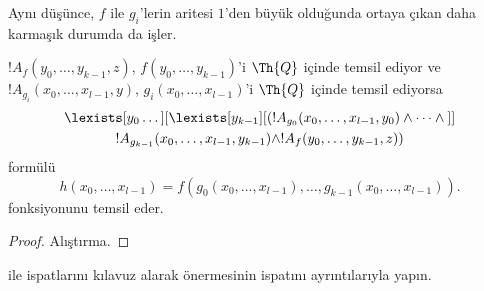 \documentclass[../../../include/open-logic-section]{subfiles}
\begin{document}
Aynı düşünce, $f$ ile $g_i$'lerin aritesi $1$'den büyük olduğunda ortaya
çıkan daha karmaşık durumda da işler.

\begin{prop}
$!A_f(y_0,\dots,y_{k-1},z)$, $f(y_0,\dots,y_{k-1})$'i $\Th{Q}$ içinde
temsil ediyor ve $!A_{g_i}(x_0,\dots,x_{l-1},y)$,
$g_i(x_0,\dots,x_{l-1})$'i $\Th{Q}$ içinde temsil ediyorsa
\begin{multline*}
  \lexists[y_0\dots][\lexists[y_{k-1}][(!A_{g_0}(x_0,\dots,x_{l-1},y_0) \land
      \dots \land {}]]\\
  !A_{g_{k-1}}(x_0,\dots,x_{l-1},y_{k-1}) \land !A_f(y_0,\dots,y_{k-1},z))
\end{multline*}
formülü
\[
h(x_0, \dots, x_{l-1}) = f(g_0(x_0, \dots, x_{l-1}), \dots, g_{k-1}(x_0,
\dots, x_{l-1})).
\]
fonksiyonunu temsil eder.
\end{prop}

\begin{proof}
Alıştırma.
\end{proof}

\begin{prob}
 ile 
ispatlarını kılavuz alarak 
önermesinin ispatını ayrıntılarıyla yapın.
\end{prob}
\end{document}
